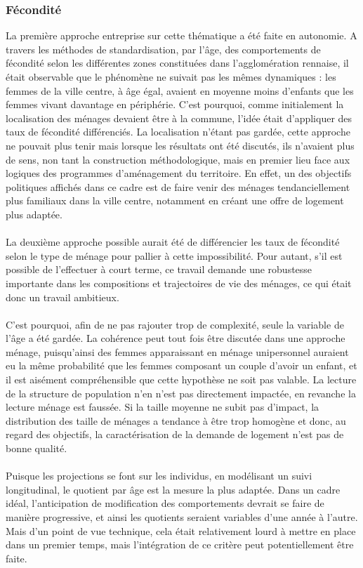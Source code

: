 \documentclass{bredele}
\begin{document}
\subsubsection{Fécondité}
La première approche entreprise sur cette thématique a été faite en autonomie. A travers les méthodes de standardisation, par l'âge, des comportements de fécondité selon les différentes zones constituées dans l'agglomération rennaise, il était observable que le phénomène ne suivait pas les mêmes dynamiques : les femmes de la ville centre, à âge égal, avaient en moyenne moins d'enfants que les femmes vivant davantage en périphérie. C'est pourquoi, comme initialement la localisation des ménages devaient être à la commune, l'idée était d'appliquer des taux de fécondité différenciés. La localisation n'étant pas gardée, cette approche ne pouvait plus tenir mais lorsque les résultats ont été discutés, ils n'avaient plus de sens, non tant la construction méthodologique, mais en premier lieu face aux logiques des programmes d'aménagement du territoire. En effet, un des objectifs politiques affichés dans ce cadre est de faire venir des ménages tendanciellement plus familiaux dans la ville centre, notamment en créant une offre de logement plus adaptée.\\\\
La deuxième approche possible aurait été de différencier les taux de fécondité selon le type de ménage pour pallier à cette impossibilité. Pour autant, s'il est possible de l'effectuer à court terme, ce travail demande une robustesse importante dans les compositions et trajectoires de vie des ménages, ce qui était donc un travail ambitieux.\\\\
C'est pourquoi, afin de ne pas rajouter trop de complexité, seule la variable de l'âge a été gardée. La cohérence peut tout fois être discutée dans une approche ménage, puisqu'ainsi des femmes apparaissant en ménage unipersonnel auraient eu la même probabilité que les femmes composant un couple d'avoir un enfant, et il est aisément compréhensible que cette hypothèse ne soit pas valable. La lecture de la structure de population n'en n'est pas directement impactée, en revanche la lecture ménage est faussée. Si la taille moyenne ne subit pas d'impact, la distribution des taille de ménages a tendance à être trop homogène et donc, au regard des objectifs, la caractérisation de la demande de logement n'est pas de bonne qualité.\\
\\Puisque les projections se font sur les individus, en modélisant un suivi longitudinal, le quotient par âge est la mesure la plus adaptée. Dans un cadre idéal, l'anticipation de modification des comportements devrait se faire de manière progressive, et ainsi les quotients seraient variables d'une année à l'autre. Mais d'un point de vue technique, cela était relativement lourd à mettre en place dans un premier temps, mais l'intégration de ce critère peut potentiellement être faite.
\end{document}
